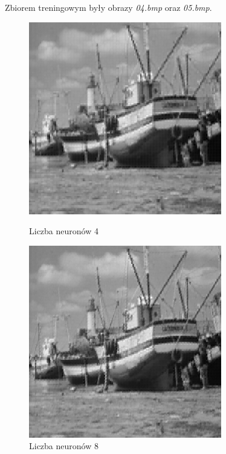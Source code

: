 \documentclass[../EDI_Task4_Karwowski_Kowalewski.tex]{subfiles}
\begin{document}
 {

    Zbiorem treningowym były obrazy \textit{04.bmp} oraz \textit{05.bmp}.
    \begin{figure}[!htbp]
        \begin{minipage}[c]{0.49\linewidth}
            \centering
            \includegraphics[width=0.75\textwidth]{img/results_4/4/compressed_03.png}
            \caption{Liczba neuronów 4}
        \end{minipage}\hfill
        \begin{minipage}[c]{0.49\linewidth}
            \centering
            \includegraphics[width=0.75\textwidth]{img/results_4/8/compressed_03.png}
            \caption{Liczba neuronów 8}
        \end{minipage}
    \end{figure}

}
\end{document}
